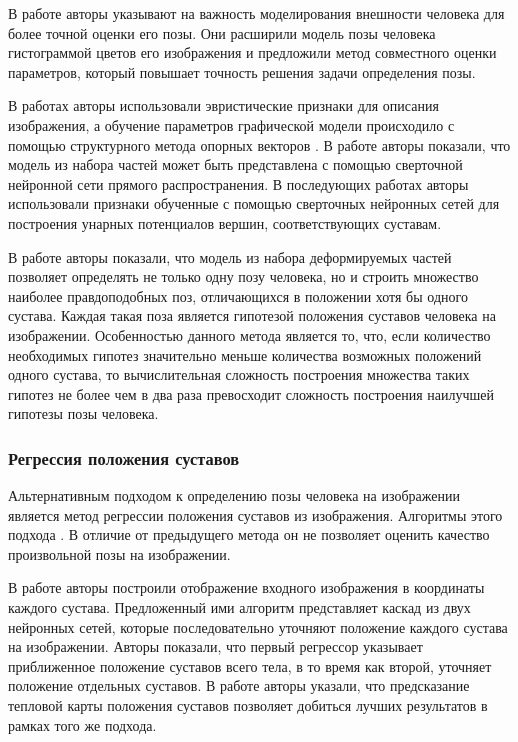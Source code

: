 В работе \cite{chou2013modeling} авторы указывают на важность моделирования внешности человека для более точной оценки его позы. Они расширили модель позы человека гистограммой цветов его изображения и предложили метод совместного оценки параметров, который повышает точность решения задачи определения позы.

В работах \cite{yang2011articulated,pirsiavash2012steerable,ghiasi2014parsing,pishchulin2013poselet} авторы использовали эвристические признаки для описания изображения, а обучение параметров графической модели происходило с помощью структурного метода опорных векторов \cite{finley2008training}. В работе \cite{girshick2015deformable} авторы показали, что модель из набора частей может быть представлена с помощью сверточной нейронной сети прямого распространения. В последующих работах \cite{chen2014articulated,tompson2014joint,chen2015parsing} авторы использовали признаки обученные с помощью сверточных нейронных сетей для построения унарных потенциалов вершин, соответствующих суставам.

В работе \cite{park2011n} авторы показали, что модель из набора деформируемых частей позволяет определять не только одну позу человека, но и строить множество наиболее правдоподобных поз, отличающихся в положении хотя бы одного сустава. Каждая такая поза является гипотезой положения суставов человека на изображении. Особенностью данного метода является то, что, если количество необходимых гипотез значительно меньше количества возможных положений одного сустава, то вычислительная сложность построения множества таких гипотез не более чем в два раза превосходит сложность построения наилучшей гипотезы позы человека.

\subsubsection{Регрессия положения суставов}

Альтернативным подходом к определению позы человека на изображении является метод регрессии положения суставов из изображения. Алгоритмы этого подхода . В отличие от предыдущего метода он не позволяет оценить качество произвольной позы на изображении.

В работе \cite{toshev2014deeppose} авторы построили отображение входного изображения в координаты каждого сустава. Предложенный ими алгоритм представляет каскад из двух нейронных сетей, которые последовательно уточняют положение каждого сустава на изображении. Авторы показали, что первый регрессор указывает приближенное положение суставов всего тела, в то время как второй, уточняет положение отдельных суставов. В работе \cite{tompson2015efficient} авторы указали, что предсказание тепловой карты положения суставов позволяет добиться лучших результатов в рамках того же подхода.

